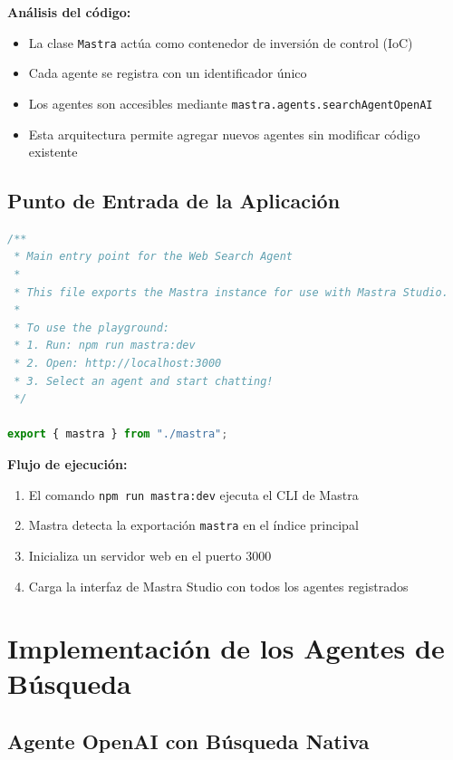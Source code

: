 \documentclass[12pt,a4paper]{article}
\begin{document}
\textbf{Análisis del código:}
\begin{itemize}
    \item La clase \texttt{Mastra} actúa como contenedor de inversión de control (IoC)
    \item Cada agente se registra con un identificador único
    \item Los agentes son accesibles mediante \texttt{mastra.agents.searchAgentOpenAI}
    \item Esta arquitectura permite agregar nuevos agentes sin modificar código existente
\end{itemize}

\subsection{Punto de Entrada de la Aplicación}

\begin{lstlisting}[language=JavaScript, caption=src/index.ts - Entry Point]
/**
 * Main entry point for the Web Search Agent
 *
 * This file exports the Mastra instance for use with Mastra Studio.
 *
 * To use the playground:
 * 1. Run: npm run mastra:dev
 * 2. Open: http://localhost:3000
 * 3. Select an agent and start chatting!
 */

export { mastra } from "./mastra";
\end{lstlisting}

\textbf{Flujo de ejecución:}
\begin{enumerate}
    \item El comando \texttt{npm run mastra:dev} ejecuta el CLI de Mastra
    \item Mastra detecta la exportación \texttt{mastra} en el índice principal
    \item Inicializa un servidor web en el puerto 3000
    \item Carga la interfaz de Mastra Studio con todos los agentes registrados
\end{enumerate}

\newpage

\section{Implementación de los Agentes de Búsqueda}

\subsection{Agente OpenAI con Búsqueda Nativa}
\end{document}
